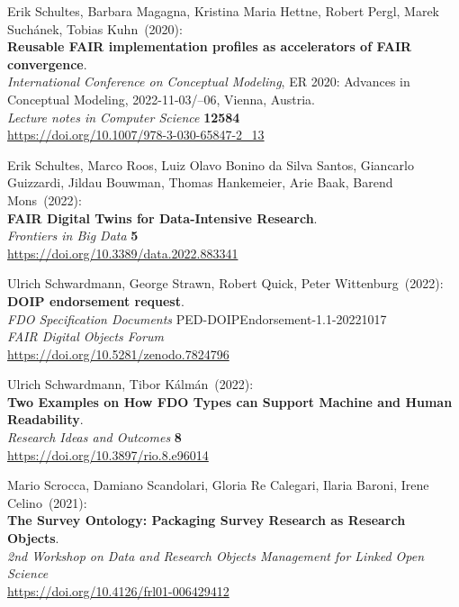 \begin{thebibliography}{9}
Erik Schultes, Barbara Magagna, Kristina Maria Hettne, Robert Pergl, Marek Suchánek, Tobias Kuhn~(2020): \\
\textbf{Reusable {FAIR} implementation profiles as accelerators of {FAIR} convergence}.\\
\emph{International Conference on Conceptual Modeling}, ER 2020: Advances in Conceptual Modeling, 2022-11-03/--06, Vienna, Austria. \\
\emph{Lecture notes in Computer Science} \textbf{12584} \\ 
\url{https://doi.org/10.1007/978-3-030-65847-2_13}

Erik Schultes, Marco Roos, Luiz Olavo Bonino da Silva Santos, Giancarlo Guizzardi, Jildau Bouwman, Thomas Hankemeier, Arie Baak, Barend Mons~(2022): \\
\textbf{FAIR Digital Twins for Data-Intensive Research}.\\
\emph{Frontiers in Big Data} \textbf{5}\\
\url{https://doi.org/10.3389/data.2022.883341}

Ulrich Schwardmann, George Strawn, Robert Quick, Peter Wittenburg~(2022): \\
\textbf{DOIP endorsement request}.\\
\emph{FDO Specification Documents} PED-DOIPEndorsement-1.1-20221017\\
\emph{FAIR Digital Objects Forum}\\
\url{https://doi.org/10.5281/zenodo.7824796}

Ulrich Schwardmann, Tibor Kálmán~(2022): \\
\textbf{Two {Examples} on {How FDO Types} can {Support Machine} and {Human Readability}}.\\
\emph{Research Ideas and Outcomes} \textbf{8} \\
\url{https://doi.org/10.3897/rio.8.e96014}

Mario Scrocca, Damiano Scandolari, Gloria Re Calegari, Ilaria Baroni, Irene Celino~(2021): \\
\textbf{The Survey Ontology: Packaging Survey Research as Research Objects}.\\
\emph{2nd Workshop on Data and Research Objects Management for Linked Open Science}\\
\url{https://doi.org/10.4126/frl01-006429412}


\end{thebibliography}
